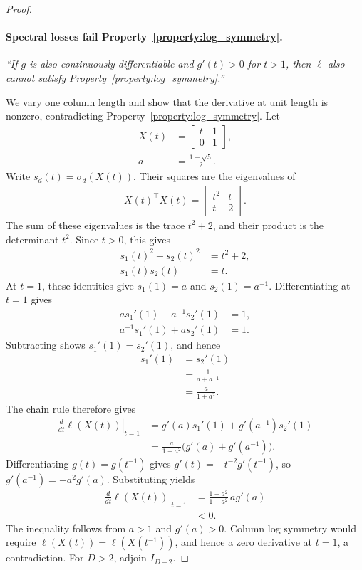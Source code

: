 \begin{proof}
\paragraph{Spectral losses fail Property~\ref{property:log_symmetry}.}
\emph{``If $g$ is also continuously differentiable and $g'(t)>0$ for $t>1$, then $\ell$ also cannot satisfy Property~\ref{property:log_symmetry}.''}

We vary one column length and show that the derivative at unit length is nonzero, contradicting Property~\ref{property:log_symmetry}.
Let
\begin{align}
X(t)&=\begin{bmatrix}t&1\\0&1\end{bmatrix}, \\
a&=\frac{1+\sqrt5}{2}.
\end{align}
Write $s_d(t)=\sigma_d(X(t))$.
Their squares are the eigenvalues of
\begin{align}
X(t)^\top X(t)=\begin{bmatrix}t^2&t\\t&2\end{bmatrix}.
\end{align}
The sum of these eigenvalues is the trace $t^2+2$, and their product is the determinant $t^2$.
Since $t>0$, this gives
\begin{align}
s_1(t)^2+s_2(t)^2&=t^2+2, \\
s_1(t)s_2(t)&=t.
\end{align}
At $t=1$, these identities give $s_1(1)=a$ and $s_2(1)=a^{-1}$.
Differentiating at $t=1$ gives
\begin{align}
a s_1'(1)+a^{-1}s_2'(1)&=1, \\
a^{-1}s_1'(1)+a s_2'(1)&=1.
\end{align}
Subtracting shows $s_1'(1)=s_2'(1)$, and hence
\begin{align}
s_1'(1)&=s_2'(1) \\
&=\frac{1}{a+a^{-1}} \\
&=\frac{a}{1+a^2}.
\end{align}
The chain rule therefore gives
\begin{align}
\left.\frac{d}{dt}\ell(X(t))\right|_{t=1}
&=g'(a)s_1'(1)+g'(a^{-1})s_2'(1) \\
&=\frac{a}{1+a^2}\bigl(g'(a)+g'(a^{-1})\bigr).
\end{align}
Differentiating $g(t)=g(t^{-1})$ gives $g'(t)=-t^{-2}g'(t^{-1})$, so $g'(a^{-1})=-a^2g'(a)$.
Substituting yields
\begin{align}
\left.\frac{d}{dt}\ell(X(t))\right|_{t=1}
&=\frac{1-a^2}{1+a^2}\,a g'(a) \\
&<0.
\end{align}
The inequality follows from $a>1$ and $g'(a)>0$.
Column log symmetry would require $\ell(X(t))=\ell(X(t^{-1}))$, and hence a zero derivative at $t=1$, a contradiction.
For $D>2$, adjoin $I_{D-2}$.
\end{proof}

